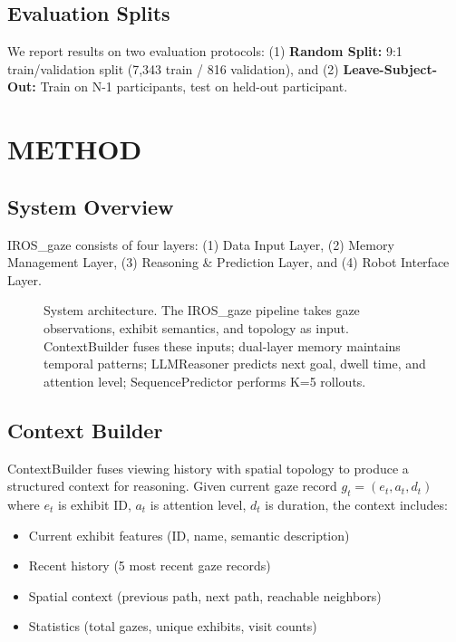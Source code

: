 \documentclass[letterpaper]{article}
\begin{document}
\subsection{Evaluation Splits}

We report results on two evaluation protocols: (1) \textbf{Random Split:} 9:1 train/validation split (7,343 train / 816 validation), and (2) \textbf{Leave-Subject-Out:} Train on N-1 participants, test on held-out participant.

\section{METHOD}

\subsection{System Overview}

IROS\_gaze consists of four layers: (1) Data Input Layer, (2) Memory Management Layer, (3) Reasoning \& Prediction Layer, and (4) Robot Interface Layer.

\begin{figure}[h]
\centering
\caption{System architecture. The IROS\_gaze pipeline takes gaze observations, exhibit semantics, and topology as input. ContextBuilder fuses these inputs; dual-layer memory maintains temporal patterns; LLMReasoner predicts next goal, dwell time, and attention level; SequencePredictor performs K=5 rollouts.}
\label{fig:architecture}
\end{figure}

\subsection{Context Builder}

ContextBuilder fuses viewing history with spatial topology to produce a structured context for reasoning. Given current gaze record $g_t = (e_t, a_t, d_t)$ where $e_t$ is exhibit ID, $a_t$ is attention level, $d_t$ is duration, the context includes:
\begin{itemize}
    \item Current exhibit features (ID, name, semantic description)
    \item Recent history (5 most recent gaze records)
    \item Spatial context (previous path, next path, reachable neighbors)
    \item Statistics (total gazes, unique exhibits, visit counts)
\end{itemize}
\end{document}

